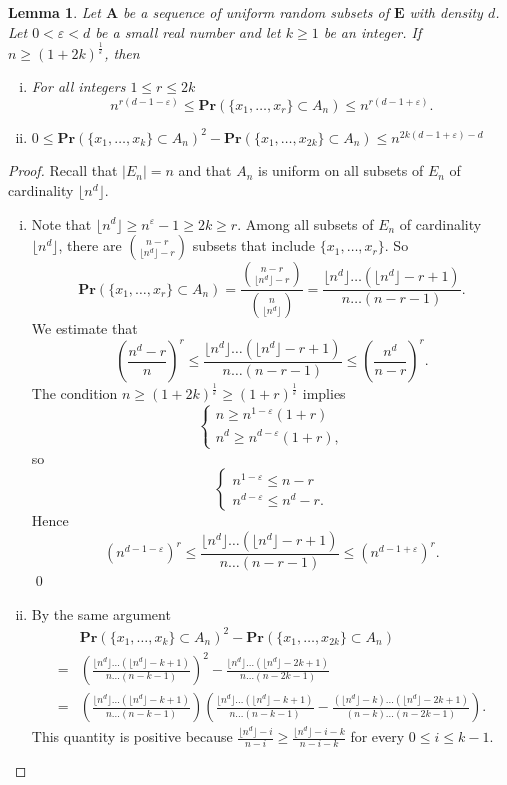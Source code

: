 \documentclass{article}
\newcommand{\bs}{\boldsymbol}
\def\Pr{\mathbf{Pr}}
\newcommand\flr[1]{\lfloor #1 \rfloor}
\newtheorem{lem}[thm]{Lemma}
\theoremstyle{remark}
\begin{document}
\begin{lem}\label{uniform include} Let $\bs A$ be a sequence of uniform random subsets of $\bs E$ with density $d$. Let $0<\varepsilon<d$ be a small real number and let $k\geq 1$ be an integer. If $n\geq (1+2k)^{\frac{1}{\varepsilon}}$, then
\begin{enumerate}[(i)]
    \item For all integers $1\leq r \leq 2k$
    \[n^{r(d-1-\varepsilon)} \leq \Pr(\{x_1,\dots,x_r\}\subset A_n)\leq n^{r(d-1+\varepsilon)}.\]
    \item $0\leq\Pr(\{x_1,\dots,x_k\}\subset A_n)^2 - \Pr(\{x_1,\dots,x_{2k}\}\subset A_n) \leq n^{2k(d-1+\varepsilon)-d}$
\end{enumerate}
\end{lem}
\begin{proof} Recall that $|E_n| = n$ and that $A_n$ is uniform on all subsets of $E_n$ of cardinality $\flr{n^d}$.
\begin{enumerate}[(i)]
    \item Note that $\flr{n^d}\geq n^\varepsilon-1\geq 2k \geq r$. Among all subsets of $E_n$ of cardinality $\flr{n^d}$, there are $\binom{n-r}{\flr{n^d}-r}$ subsets that include $\{x_1,\dots,x_r\}$. So
    \[\Pr(\{x_1,\dots,x_r\}\subset A_n) = \frac{\binom{n-r}{\flr{n^d}-r}}{\binom{n}{\flr{n^d}}} = \frac{\flr{n^d}\dots(\flr{n^d}-r+1)}{n\dots(n-r-1)}.\]
    We estimate that
    \[\left(\frac{n^d-r}{n}\right)^r \leq \frac{\flr{n^d}\dots(\flr{n^d}-r+1)}{n\dots(n-r-1)} \leq \left(\frac{n^d}{n-r}\right)^r.\]
    The condition $n \geq (1+2k)^{\frac{1}{\varepsilon}} \geq (1+r)^{\frac{1}{\varepsilon}}$ implies
    \[\begin{cases}
        n \geq n^{1-\varepsilon}(1+r)\\
        n^d \geq n^{d-\varepsilon}(1+r),
    \end{cases}\]
    so
    \[\begin{cases}
        n^{1-\varepsilon} \leq n-r\\
        n^{d-\varepsilon} \leq n^d-r.
    \end{cases}\]
    Hence
    \[\left(n^{d-1-\varepsilon}\right)^r \leq \frac{\flr{n^d}\dots(\flr{n^d}-r+1)}{n\dots(n-r-1)} \leq \left(n^{d-1+\varepsilon}\right)^r.\]\qed
    
    \item By the same argument 
    \begin{align*}&\Pr(\{x_1,\dots,x_k\}\subset A_n)^2- \Pr(\{x_1,\dots,x_{2k}\}\subset A_n) \\
    = & \left(\frac{\flr{n^d}\dots(\flr{n^d}-k+1)}{n\dots(n-k-1)}\right)^2 - \frac{\flr{n^d}\dots(\flr{n^d}-2k+1)}{n\dots(n-2k-1)}\\
    = & \left(\frac{\flr{n^d}\dots(\flr{n^d}-k+1)}{n\dots(n-k-1)}\right)\left(\frac{\flr{n^d}\dots(\flr{n^d}-k+1)}{n\dots(n-k-1)} - \frac{(\flr{n^d}-k)\dots(\flr{n^d}-2k+1)}{(n-k)\dots(n-2k-1)} \right).
    \end{align*}
    This quantity is positive because 
    $\frac{\flr{n^d}-i}{n-i}\geq \frac{\flr{n^d}-i-k}{n-i-k}$
    for every $0\leq i \leq k-1$.
    

\end{enumerate}
\end{proof}
\end{document}
